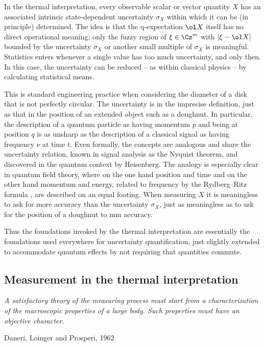 \documentclass[12pt]{article}
\begin{document}
In the thermal interpretation, every observable scalar or vector 
quantity $X$ has an associated intrinsic state-dependent uncertainty 
$\sigma_X$ within which it can be (in principle) determined. The idea 
is that the q-expectation $\ol X$ itself has no direct operational 
meaning; only the fuzzy region of $\xi\in\Cz^m$ with $|\xi-\ol X|$ 
bounded by the uncertainty $\sigma_X$ or another small multiple of 
$\sigma_X$ is meaningful. Statistics enters whenever a single value 
has too much uncertainty, and only then. In this case, the uncertainty 
can be reduced -- as within classical physics -- by calculating 
statistical means. 

This is standard engineering practice when considering the diameter of a
disk that is not perfectly circular. The uncertainty is in the imprecise
definition, just as that in the position of an extended object such as 
a doughnut. In particular, the description of a quantum particle as 
having momentum $p$ and being at position $q$ is as unsharp as the 
description of a classical signal as having frequency $\nu$ at time $t$.
Even formally, the concepts are
analogous and share the uncertainty relation, known in signal analysis
as the Nyquist theorem, and discovered in the quantum context by 
Heisenberg. The analogy is especially clear in quantum field
theory, where on the one hand position and time and on the other hand 
momentum and energy, related to frequency by the Rydberg--Ritz formula 
, are described on an equal footing.
When measuring $X$ it is meaningless to ask for more accuracy than the 
uncertainty $\sigma_X$, just as meaningless as to ask for the position
of a doughnut to mm accuracy. 

Thus the foundations invoked by the thermal interpretation are 
essentially the foundations used everywhere for uncertainty 
quantification, just slightly extended to accommodate quantum effects 
by not requiring that quantities commute.




\subsection{Measurement in the thermal interpretation}
\label{ss.measTI}

\nopagebreak
\hfill\parbox[t]{10.8cm}{\footnotesize

{\em
A satisfactory theory of the measuring process must start from a
characterization of the macroscopic properties of a large body. Such
properties must have an objective character.}

\hfill Daneri, Loinger and Prosperi, 1962 \cite[p.305]{DanLP}
}
\end{document}
